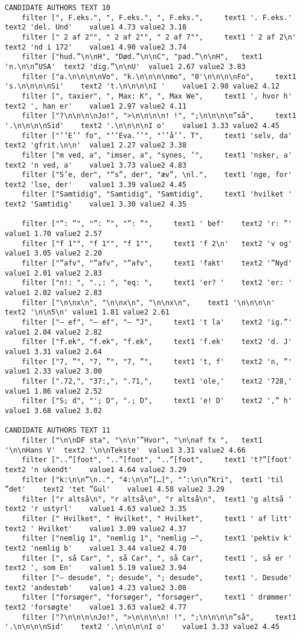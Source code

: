 {\begin{verbatim}
CANDIDATE AUTHORS TEXT 10
	filter [", F.eks.", ", F.eks.", ", F.eks.", 	text1 '. F.eks.'	text2 'del. Und'	value1 4.73	value2 3.18
	filter [" 2 af 2"", " 2 af 2"", " 2 af 7"", 	text1 ' 2 af 2\n'	text2 'nd i 172'	value1 4.90	value2 3.74
	filter ["hud.”\n\nH", "Død.”\n\nC", "pad.”\n\nH", 	text1 'n.\n\n”USA'	text2 'dig.”\n\nU'	value1 2.67	value2 3.83
	filter ["a.\n\n\n\nVo", "k.\n\n\n\nmo", "0'\n\n\n\nFo", 	text1 's.\n\n\n\nSi'	text2 't.\n\n\n\nI '	value1 2.98	value2 4.12
	filter [", taxier", ", Max: K", ", Max We", 	text1 ', hvor h'	text2 ', han er'	value1 2.97	value2 4.11
	filter ["?\n\n\n\nJo!", ">\n\n\n\n! !", ";\n\n\n\n”så", 	text1 '.\n\n\n\nSid'	text2 '.\n\n\n\nI o'	value1 3.33	value2 4.45
	filter ["’’E’’ fo", "’’Eva.’’", "’’å’’. T", 	text1 'selv, da'	text2 'gfrit.\n\n'	value1 2.27	value2 3.38
	filter ["m ved, a", "imser, a", "synes, ’", 	text1 'nsker, a'	text2 'n ved, a'	value1 3.73	value2 4.83
	filter ["S’e, der", "“s”, der", "æv”, \nl.", 	text1 'nge, for'	text2 'lse, der'	value1 3.39	value2 4.45
	filter ["Samtidig", "Samtidig", "Samtidig", 	text1 'hvilket '	text2 'Samtidig'	value1 3.30	value2 4.35

	filter ["”: ”", "”: ”", "”: ”", 	text1 ' bef'	text2 'r: ”'	value1 1.70	value2 2.57
	filter ["f 1"", "f 1"", "f 1"", 	text1 'f 2\n'	text2 'v og'	value1 3.05	value2 2.20
	filter ["”afv", "”afv", "”afv", 	text1 'fakt'	text2 '”Nyd'	value1 2.01	value2 2.83
	filter ["n!: ", ".,: ", "eq: ", 	text1 'er? '	text2 'er: '	value1 2.02	value2 2.83
	filter ["\n\nx\n", "\n\nx\n", "\n\nx\n", 	text1 '\n\n\n\n'	text2 '\n\n5\n'	value1 1.81	value2 2.61
	filter ["– ef", "– ef", "– “J", 	text1 't la'	text2 'ig.”'	value1 2.04	value2 2.82
	filter ["f.ek", "f.ek", "f.ek", 	text1 'f.ek'	text2 'd. J'	value1 3.31	value2 2.64
	filter ["7, ”", "7, ”", "7, ”", 	text1 't, f'	text2 'n, ”'	value1 2.33	value2 3.00
	filter [".72,", "37:,", ".71,", 	text1 'ole,'	text2 '728,'	value1 1.86	value2 2.52
	filter ["S; d", "'; D", ".; D", 	text1 'e! D'	text2 ',” h'	value1 3.68	value2 3.02

CANDIDATE AUTHORS TEXT 11
	filter ["\n\nDF sta", "\n\n’”Hvor", "\n\naf fx ", 	text1 '\n\nHans V'	text2 '\n\nTekste'	value1 3.31	value2 4.66
	filter ["..”[foot", "..”[foot", "..”[foot", 	text1 't?”[foot'	text2 'n ukendt'	value1 4.64	value2 3.29
	filter ["k:\n\n”\n..", "4:\n\n”[…]", "’:\n\n”Kri", 	text1 'til ”det'	text2 'tet ”Gul'	value1 4.58	value2 3.29
	filter ["r altså\n", "r altså\n", "r altså\n", 	text1 'g altså '	text2 'r ustyrl'	value1 4.63	value2 3.35
	filter [" Hvilket", " Hvilket", " Hvilket", 	text1 ' af litt'	text2 ' Hvilket'	value1 3.09	value2 4.37
	filter ["nemlig 1", "nemlig 1", "nemlig –", 	text1 'pektiv k'	text2 'nemlig b'	value1 3.44	value2 4.70
	filter [", så Car", ", så Car", ", så Car", 	text1 ', så er '	text2 ', som En'	value1 5.19	value2 3.94
	filter ["– desude", "; desude", "; desude", 	text1 '. Desude'	text2 'andestøb'	value1 4.23	value2 3.08
	filter ["forsøger", "forsøger", "forsøger", 	text1 ' drømmer'	text2 'forsøgte'	value1 3.63	value2 4.77
	filter ["?\n\n\n\nJo!", ">\n\n\n\n! !", ";\n\n\n\n”så", 	text1 '.\n\n\n\nSid'	text2 '.\n\n\n\nI o'	value1 3.33	value2 4.45


\end{verbatim}}
